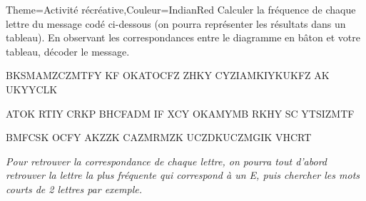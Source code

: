 \begin{Maquette}[Cours]{Theme={Activité récréative},Couleur={IndianRed}}
      Calculer la fréquence de chaque lettre du message codé ci-dessous (on pourra représenter les résultats dans un tableau). En observant les correspondances entre le diagramme en bâton et votre tableau, décoder le message. 
      \begin{center}
         \begin{tcolorbox}
            BKSMAMZCZMTFY \; KF \; OKATOCFZ \; ZHKY \; CYZIAMKIYKUKFZ \; AK \; UKYYCLK \par
            ATOK \; RTIY \; CRKP \; BHCFADM \; IF \; XCY \; OKAMYMB \; RKHY \; SC \; YTSIZMTF \par
            BMFCSK \; OCFY \; AKZZK \; CAZMRMZK \; UCZDKUCZMGIK \; VHCRT
         \end{tcolorbox}
      \end{center}

      \vfill
      
      {\it Pour retrouver la correspondance de chaque lettre, on pourra tout d'abord retrouver la lettre la plus fréquente qui correspond à un E, puis chercher les mots courts de 2 lettres par exemple.
      
      \vfill
      
      \hspace*{9.5cm}}

\end{Maquette}